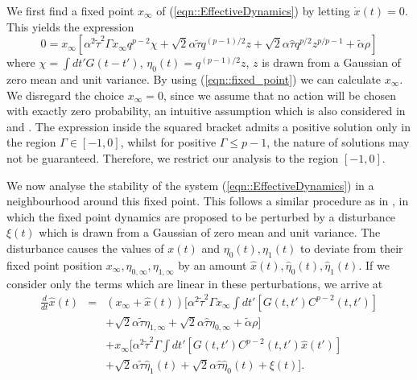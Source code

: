 \documentclass[sigconf,anonymous]{aamas}
\newcommand{\talpha}{\tilde{\alpha}}
\newcommand{\ttau}{\tilde{\tau}}
\newcommand{\htau}{\hat{\tau}}
\newcommand{\xfixed}{x_\infty}
\newcommand{\ezerof}{\eta_{0, \infty}}
\newcommand{\eonef}{\eta_{1, \infty}}
\newcommand{\xpert}{\hat{x}(t)}
\newcommand{\xpertdash}{\hat{x}(t')}
\newcommand{\ezeropert}{\hat{\eta}_0(t)}
\newcommand{\eonepert}{\hat{\eta}_1(t)}
\begin{document}
We first find a fixed point $\xfixed$ of (\ref{eqn::EffectiveDynamics}) by letting $\dot{x}(t)= 0$. This yields the expression 
%
\begin{equation}
    0  = \xfixed [ \alpha^2 \ttau^2 \Gamma \xfixed q^{p-2} \chi + \sqrt{2} \alpha \ttau q^{(p-1)/2}z + \sqrt{2} \alpha \htau q^{p/2} z^{p/p-1} + \talpha \rho]
    \label{eqn::fixed_point}
\end{equation}
%
where $\chi = \int dt' G(t - t')$, $\eta_0(t) = q^{(p-1)/2}z$, $z$ is
drawn from a Gaussian of zero mean and unit variance. By using (\ref{eqn::fixed_point}) we can
calculate $\xfixed$. We disregard the choice $\xfixed = 0$, since we
assume that no action will be chosen with exactly zero probability, an
intuitive assumption which is also considered in \cite{Sanders2018}
and \cite{Coolen2005}. The expression inside the squared bracket
admits a positive solution only in the region $\Gamma \in [-1, 0]$,
whilst for positive $\Gamma \leq p-1$, the nature of solutions may
not be guaranteed. Therefore, we restrict our analysis to the region
$[-1, 0]$.

We now analyse the stability of the system (\ref{eqn::EffectiveDynamics}) in a neighbourhood around
this fixed point. This follows a similar procedure as in \cite{Opper1992}, in
which the fixed point dynamics are proposed to be perturbed by a
disturbance $\xi(t)$ which is drawn from a Gaussian of zero mean and
unit variance. The disturbance causes the values of $x(t)$ and
$\eta_0(t), \eta_1(t)$ to deviate from their fixed point position
$\xfixed, \ezerof, \eonef$ by an amount $\xpert, \ezeropert,
\eonepert$.  If we consider only the terms which are linear in these
perturbations, we arrive at 
%
\begin{eqnarray}
\frac{d}{dt} \xpert & = & (\xfixed + \xpert) [ \alpha^2 \ttau^2 \Gamma \xfixed \int dt' [ G(t, t')C^{p - 2}(t, t') ] \nonumber \\
  & & + \sqrt{2} \alpha \ttau \eonef + \sqrt{2} \alpha \htau \ezerof + \talpha \rho] \nonumber \\
& &  + \xfixed [\alpha^2 \ttau^2 \Gamma \int dt' [ G(t, t')C^{p - 2}(t, t') \xpertdash ] \nonumber \\
  & & + \sqrt{2} \alpha \ttau \eonepert + \sqrt{2} \alpha \htau \ezeropert + \xi(t)].
\label{eqn::Linearised}
\end{eqnarray}
\end{document}
